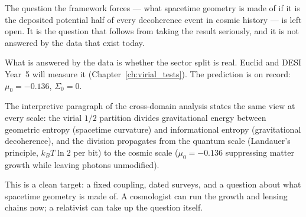 The question the framework forces --- what spacetime geometry is made of if it is the deposited potential half of every decoherence event in cosmic
history --- is left open. It is the question that follows from taking the result seriously, and it is not answered by the data that exist today.

What is answered by the data is whether the sector split is real. Euclid and DESI Year~5 will measure it (Chapter~\ref{ch:virial_tests}). The prediction is
on record: $\mu_0=-0.136$, $\Sigma_0=0$. \prediction

The interpretive paragraph of the cross-domain analysis states the same view at every scale: the virial $1/2$ partition divides gravitational energy
between geometric entropy (spacetime curvature) and informational entropy (gravitational decoherence), and the division propagates from the quantum scale
(Landauer's principle, $k_BT\ln2$ per bit) to the cosmic scale ($\mu_0=-0.136$ suppressing matter growth while leaving photons unmodified). \interp

This is a clean target: a fixed coupling, dated surveys, and a question about what spacetime geometry is made of. A cosmologist can run the growth and lensing chains now; a relativist can take up the question itself.
